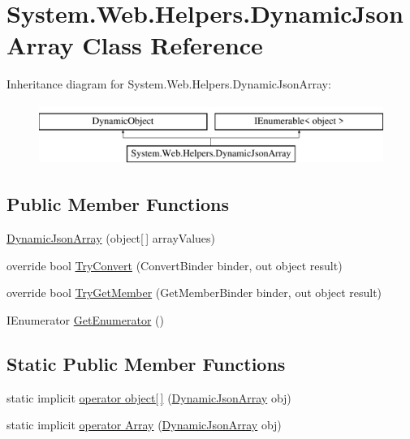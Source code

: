 \hypertarget{classSystem_1_1Web_1_1Helpers_1_1DynamicJsonArray}{}\section{System.\+Web.\+Helpers.\+Dynamic\+Json\+Array Class Reference}
\label{classSystem_1_1Web_1_1Helpers_1_1DynamicJsonArray}
Inheritance diagram for System.\+Web.\+Helpers.\+Dynamic\+Json\+Array\+:\begin{figure}[H]
\begin{center}
\leavevmode
\includegraphics[height=2.000000cm]{classSystem_1_1Web_1_1Helpers_1_1DynamicJsonArray}
\end{center}
\end{figure}
\subsection*{Public Member Functions}
\begin{DoxyCompactItemize}
\item 
\hyperlink{classSystem_1_1Web_1_1Helpers_1_1DynamicJsonArray_afbecf116a8981eaf517a54e71ee7cc48_afbecf116a8981eaf517a54e71ee7cc48}{Dynamic\+Json\+Array} (object\mbox{[}$\,$\mbox{]} array\+Values)
\item 
override bool \hyperlink{classSystem_1_1Web_1_1Helpers_1_1DynamicJsonArray_a29e38e43a5955adc215833bb36650c37_a29e38e43a5955adc215833bb36650c37}{Try\+Convert} (Convert\+Binder binder, out object result)
\item 
override bool \hyperlink{classSystem_1_1Web_1_1Helpers_1_1DynamicJsonArray_a5a486af1f3055a91ace0c21476677527_a5a486af1f3055a91ace0c21476677527}{Try\+Get\+Member} (Get\+Member\+Binder binder, out object result)
\item 
I\+Enumerator \hyperlink{classSystem_1_1Web_1_1Helpers_1_1DynamicJsonArray_a312cd8a3b66ad5ce5ff640763826b057_a312cd8a3b66ad5ce5ff640763826b057}{Get\+Enumerator} ()
\end{DoxyCompactItemize}
\subsection*{Static Public Member Functions}
\begin{DoxyCompactItemize}
\item 
static implicit \hyperlink{classSystem_1_1Web_1_1Helpers_1_1DynamicJsonArray_aa4bc62411aa6ec4bed9c8551a110d62a_aa4bc62411aa6ec4bed9c8551a110d62a}{operator object\mbox{[}$\,$\mbox{]}} (\hyperlink{classSystem_1_1Web_1_1Helpers_1_1DynamicJsonArray}{Dynamic\+Json\+Array} obj)
\item 
static implicit \hyperlink{classSystem_1_1Web_1_1Helpers_1_1DynamicJsonArray_a4f1b74ac91d5f8f3a2b95475e05c4ad7_a4f1b74ac91d5f8f3a2b95475e05c4ad7}{operator Array} (\hyperlink{classSystem_1_1Web_1_1Helpers_1_1DynamicJsonArray}{Dynamic\+Json\+Array} obj)
\end{DoxyCompactItemize}
